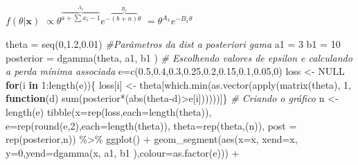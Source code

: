\documentclass[
]{book}
\newenvironment{Shaded}{\begin{snugshade}}{\end{snugshade}}
\newcommand{\AttributeTok}[1]{\textcolor[rgb]{0.77,0.63,0.00}{#1}}
\newcommand{\CommentTok}[1]{\textcolor[rgb]{0.56,0.35,0.01}{\textit{#1}}}
\newcommand{\ConstantTok}[1]{\textcolor[rgb]{0.00,0.00,0.00}{#1}}
\newcommand{\ControlFlowTok}[1]{\textcolor[rgb]{0.13,0.29,0.53}{\textbf{#1}}}
\newcommand{\DecValTok}[1]{\textcolor[rgb]{0.00,0.00,0.81}{#1}}
\newcommand{\FloatTok}[1]{\textcolor[rgb]{0.00,0.00,0.81}{#1}}
\newcommand{\FunctionTok}[1]{\textcolor[rgb]{0.00,0.00,0.00}{#1}}
\newcommand{\NormalTok}[1]{#1}
\newcommand{\OtherTok}[1]{\textcolor[rgb]{0.56,0.35,0.01}{#1}}
\newcommand{\SpecialCharTok}[1]{\textcolor[rgb]{0.00,0.00,0.00}{#1}}
\begin{document}
\(f(\theta|\boldsymbol x)\) \(\propto \theta^{\overbrace{a+\sum x_i-1}^{A_x}}e^{-\overbrace{(b+n)}^{B_x}\theta}\) \(=\theta^{A_x}e^{-{B_x}\theta}\)

\begin{Shaded}
\begin{Highlighting}[]
\NormalTok{theta }\OtherTok{=} \FunctionTok{seq}\NormalTok{(}\DecValTok{0}\NormalTok{,}\FloatTok{1.2}\NormalTok{,}\FloatTok{0.01}\NormalTok{)}
\CommentTok{\#Parâmetros da dist a posteriori gama}
\NormalTok{a1 }\OtherTok{=} \DecValTok{3}
\NormalTok{b1 }\OtherTok{=} \DecValTok{10}
\NormalTok{posterior }\OtherTok{=} \FunctionTok{dgamma}\NormalTok{(theta, a1, b1 )}
\CommentTok{\# Escolhendo valores de epsilon e calculando a perda mínima associada}
\NormalTok{e}\OtherTok{=}\FunctionTok{c}\NormalTok{(}\FloatTok{0.5}\NormalTok{,}\FloatTok{0.4}\NormalTok{,}\FloatTok{0.3}\NormalTok{,}\FloatTok{0.25}\NormalTok{,}\FloatTok{0.2}\NormalTok{,}\FloatTok{0.15}\NormalTok{,}\FloatTok{0.1}\NormalTok{,}\FloatTok{0.05}\NormalTok{,}\DecValTok{0}\NormalTok{)}
\NormalTok{loss }\OtherTok{\textless{}{-}} \ConstantTok{NULL}
\ControlFlowTok{for}\NormalTok{(i }\ControlFlowTok{in} \DecValTok{1}\SpecialCharTok{:}\FunctionTok{length}\NormalTok{(e))\{}
\NormalTok{  loss[i] }\OtherTok{\textless{}{-}}\NormalTok{ theta[}\FunctionTok{which.min}\NormalTok{(}\FunctionTok{as.vector}\NormalTok{(}\FunctionTok{apply}\NormalTok{(}\FunctionTok{matrix}\NormalTok{(theta), }\DecValTok{1}\NormalTok{,}
                                              \ControlFlowTok{function}\NormalTok{(d) }\FunctionTok{sum}\NormalTok{(posterior}\SpecialCharTok{*}\NormalTok{(}\FunctionTok{abs}\NormalTok{(theta}\SpecialCharTok{{-}}\NormalTok{d)}\SpecialCharTok{\textgreater{}}\NormalTok{e[i])))))]\}}
\CommentTok{\# Criando o gráfico }
\NormalTok{n }\OtherTok{\textless{}{-}} \FunctionTok{length}\NormalTok{(e)}
\FunctionTok{tibble}\NormalTok{(}\AttributeTok{x=}\FunctionTok{rep}\NormalTok{(loss,}\AttributeTok{each=}\FunctionTok{length}\NormalTok{(theta)),}
       \AttributeTok{e=}\FunctionTok{rep}\NormalTok{(}\FunctionTok{round}\NormalTok{(e,}\DecValTok{2}\NormalTok{),}\AttributeTok{each=}\FunctionTok{length}\NormalTok{(theta)),}
       \AttributeTok{theta=}\FunctionTok{rep}\NormalTok{(theta,(n)), }\AttributeTok{post =} \FunctionTok{rep}\NormalTok{(posterior,n)) }\SpecialCharTok{\%\textgreater{}\%} 
  \FunctionTok{ggplot}\NormalTok{() }\SpecialCharTok{+} 
  \FunctionTok{geom\_segment}\NormalTok{(}\FunctionTok{aes}\NormalTok{(}\AttributeTok{x=}\NormalTok{x, }\AttributeTok{xend=}\NormalTok{x, }\AttributeTok{y=}\DecValTok{0}\NormalTok{,}\AttributeTok{yend=}\FunctionTok{dgamma}\NormalTok{(x, a1, b1 ),}\AttributeTok{colour=}\FunctionTok{as.factor}\NormalTok{(e))) }\SpecialCharTok{+}

\end{Highlighting}
\end{Shaded}
\end{document}
